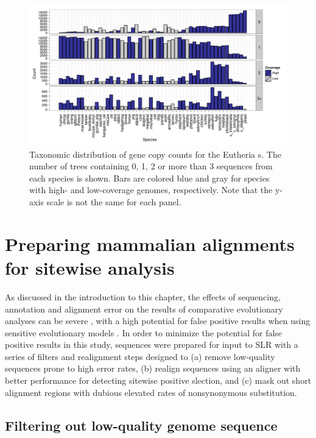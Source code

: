 \begin{landscape}
\begin{figure}[ht]
\centering
\includegraphics[scale=0.9]{Figs/ortholog_euth_dups.pdf}
\caption{Taxonomic distribution of gene copy counts for the Eutheria
  \subtr{}s. The number of trees containing 0, 1, 2 or more than 3
  sequences from each species is shown. Bars are colored blue and gray
  for species with high- and low-coverage genomes, respectively. Note
  that the y-axis scale is not the same for each panel.}
\label{ortholog_euth_dups}
\end{figure}
\end{landscape}

\section{Preparing mammalian alignments for sitewise analysis}

As discussed in the introduction to this chapter, the effects of
sequencing, annotation and alignment error on the results of
comparative evolutionary analyses can be severe \citep{TODO}, with a
high potential for false positive results when using sensitive
evolutionary models \citep{TODO}. In order to minimize the potential
for false positive results in this study, sequences were prepared for
input to SLR with a series of filters and realignment steps designed
to (a) remove low-quality sequences prone to high error rates, (b)
realign sequences using an aligner with better performance for
detecting sitewise positive slection, and (c) mask out short alignment
regions with dubious elevated rates of nonsynonymous substitution. 

\subsection{Filtering out low-quality genome sequence}

